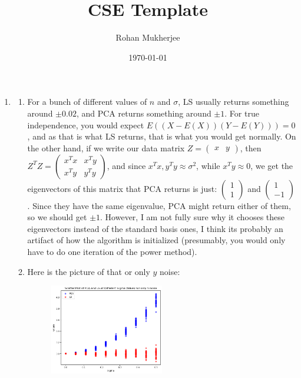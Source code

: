 \documentclass[12pt]{article}
\title{CSE Template}
\date{\today}
\author{Rohan Mukherjee}
\theoremstyle{definitionstyle}
\begin{document}
    \maketitle
    \begin{enumerate}[leftmargin=\labelsep]
        \item \begin{enumerate}[label=(\alph*)]
            \item For a bunch of different values of $n$ and $\sigma$, LS usually returns something around $\pm 0.02$, and PCA returns something around $\pm 1$. For true independence, you would expect $E((X-E(X))(Y-E(Y))) = 0$, and as that is what LS returns, that is what you would get normally. On the other hand, if we write our data matrix $Z = \begin{pmatrix}
                x & y
            \end{pmatrix}$, then $Z^TZ = \begin{pmatrix}
                x^Tx & x^Ty \\
                x^Ty & y^Ty
            \end{pmatrix}$, and since $x^Tx, y^Ty \approx \sigma^2$, while $x^Ty \approx 0$, we get the eigenvectors of this matrix that PCA returns is just: $\begin{pmatrix}
                1 \\ 1
            \end{pmatrix}$ and $\begin{pmatrix}
                1 \\ -1
            \end{pmatrix}$. Since they have the same eigenvalue, PCA might return either of them, so we should get $\pm 1$. However, I am not fully sure why it chooses these eigenvectors instead of the standard basis ones, I think its probably an artifact of how the algorithm is initialized (presumably, you would only have to do one iteration of the power method).

            \item Here is the picture of that or only $y$ noise:
            \begin{figure}[H]
                \centering
                \includegraphics[width=0.5\textwidth]{y_noise.png}
            \end{figure}


\end{enumerate}
\end{enumerate}
\end{document}
